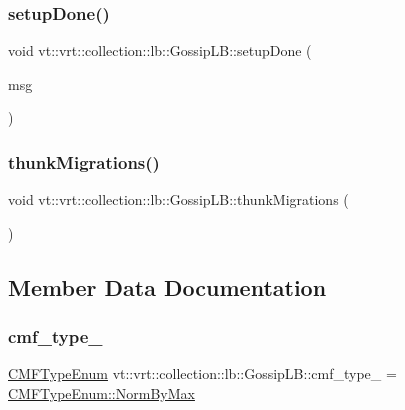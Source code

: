 \subsubsection{\texorpdfstring{setup\+Done()}{setupDone()}}
{\footnotesize\ttfamily void vt\+::vrt\+::collection\+::lb\+::\+Gossip\+L\+B\+::setup\+Done (\begin{DoxyParamCaption}\item[{\hyperlink{structvt_1_1vrt_1_1collection_1_1lb_1_1_gossip_l_b_ad251f887a319f433771b084187ef6089}{Reduce\+Msg\+Type} $\ast$}]{msg }\end{DoxyParamCaption})\hspace{0.3cm}{\ttfamily [protected]}}

\mbox{\label{structvt_1_1vrt_1_1collection_1_1lb_1_1_gossip_l_b_a7693c8b06ab78ef3565687621d810450}} 
\subsubsection{\texorpdfstring{thunk\+Migrations()}{thunkMigrations()}}
{\footnotesize\ttfamily void vt\+::vrt\+::collection\+::lb\+::\+Gossip\+L\+B\+::thunk\+Migrations (\begin{DoxyParamCaption}{ }\end{DoxyParamCaption})\hspace{0.3cm}{\ttfamily [protected]}}



\subsection{Member Data Documentation}
\mbox{\label{structvt_1_1vrt_1_1collection_1_1lb_1_1_gossip_l_b_a6aa1138914f2f997681de2f73ec09e14}} 
\subsubsection{\texorpdfstring{cmf\+\_\+type\+\_\+}{cmf\_type\_}}
{\footnotesize\ttfamily \hyperlink{namespacevt_1_1vrt_1_1collection_1_1lb_ada1e381e6b19ba9f8277d4f698445404}{C\+M\+F\+Type\+Enum} vt\+::vrt\+::collection\+::lb\+::\+Gossip\+L\+B\+::cmf\+\_\+type\+\_\+ = \hyperlink{namespacevt_1_1vrt_1_1collection_1_1lb_ada1e381e6b19ba9f8277d4f698445404a2a17cd13e37fb3cacfea703c5edc3680}{C\+M\+F\+Type\+Enum\+::\+Norm\+By\+Max}\hspace{0.3cm}{\ttfamily [private]}}

